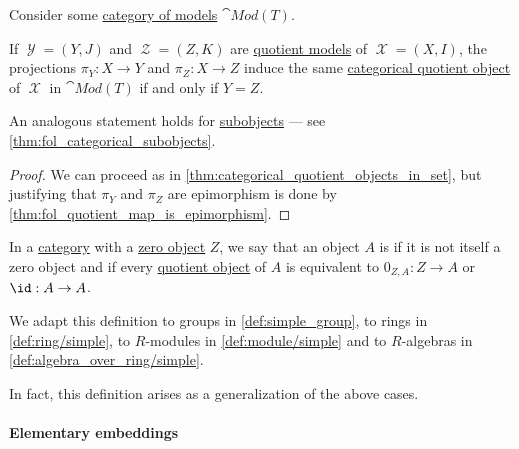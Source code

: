 \begin{proposition}\label{thm:fol_categorical_quotient_objects}
  Consider some \hyperref[def:fol_theory_model_functor/obj]{category of models} \( \cat{Mod}(T) \).

  If \( \mscrY = (Y, J) \) and \( \mscrZ = (Z, K) \) are \hyperref[def:fol_quotient_structure/model]{quotient models} of \( \mscrX = (X, I) \), the projections \( \pi_Y: X \to Y \) and \( \pi_Z: X \to Z \) induce the same \hyperref[def:categorical_quotient_object]{categorical quotient object} of \( \mscrX \) in \( \cat{Mod}(T) \) if and only if \( Y = Z \).
\end{proposition}
\begin{comments}
  \item An analogous statement holds for \hyperref[def:categorical_subobject]{subobjects} --- see \cref{thm:fol_categorical_subobjects}.
\end{comments}
\begin{proof}
  We can proceed as in \cref{thm:categorical_quotient_objects_in_set}, but justifying that \( \pi_Y \) and \( \pi_Z \) are epimorphism is done by \cref{thm:fol_quotient_map_is_epimorphism}.
\end{proof}

\begin{definition}\label{def:simple_object}\mimprovised
  In a \hyperref[def:category]{category} with a \hyperref[def:universal_objects/zero]{zero object} \( Z \), we say that an object \( A \) is  if it is not itself a zero object and if every \hyperref[def:categorical_quotient_object]{quotient object} of \( A \) is equivalent to \( 0_{Z,A}: Z \to A \) or \( \id: A \to A \).
\end{definition}
\begin{comments}
  \item We adapt this definition to groups in \cref{def:simple_group}, to rings in \cref{def:ring/simple}, to \( R \)-modules in \cref{def:module/simple} and to \( R \)-algebras in \cref{def:algebra_over_ring/simple}.

  In fact, this definition arises as a generalization of the above cases.
\end{comments}

\paragraph{Elementary embeddings}

